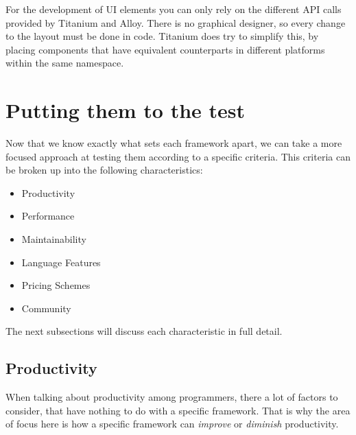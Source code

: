 For the development of \ac{UI} elements you can only rely on the different \ac{API} calls provided by Titanium and Alloy. There is no graphical designer, so every change to the layout must be done in code. Titanium does try to simplify this, by placing components that have equivalent counterparts in different platforms within the same namespace.   



\section{Putting them to the test}\label{criteria}
Now that we know exactly what sets each framework apart, we can take a more focused approach at testing them according to a specific criteria. This criteria can be broken up into the following characteristics:

\begin{itemize}
\item Productivity
\item Performance
\item Maintainability
\item Language Features
\item Pricing Schemes
\item Community
\end{itemize}
The next subsections will discuss each characteristic in full detail.

\subsection{Productivity}%
When talking about productivity among programmers, there a lot of factors to consider, that have nothing to do with a specific framework. That is why the area of focus here is how a specific framework can \textit{improve} or \textit{diminish} productivity.

